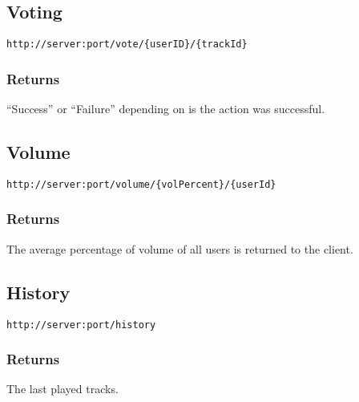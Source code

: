 \subsection{Voting}

\begin{lstlisting}[label={lst:endpoint_vote}, caption={Text surrounded by curly brackets are parameters.}]
http://server:port/vote/{userID}/{trackId}
\end{lstlisting}

\subsubsection{Returns}
\enquote{Success} or \enquote{Failure} depending on is the action was successful.

\subsection{Volume}

\begin{lstlisting}[label={lst:endpoint_volume}, caption={Text surrounded by curly brackets are parameters.}]
http://server:port/volume/{volPercent}/{userId}
\end{lstlisting}

\subsubsection{Returns}
The average percentage of volume of all users is returned to the client.

\subsection{History}

\begin{lstlisting}[label={lst:endpoint_history}, caption={Endpoint for
  history.}]
http://server:port/history
\end{lstlisting}

\subsubsection{Returns}
The last played tracks.

